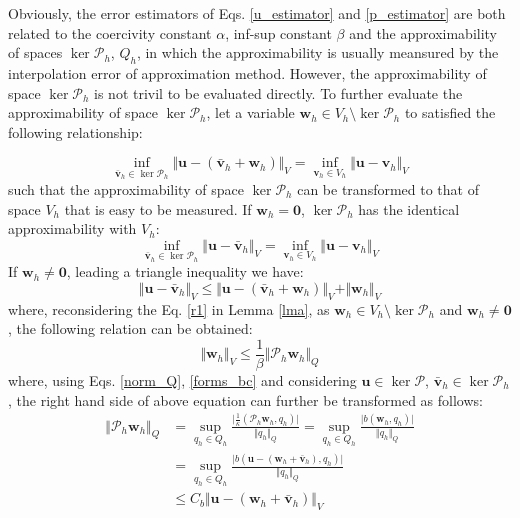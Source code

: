 Obviously,  
the error estimators of Eqs. \eqref{u_estimator} and \eqref{p_estimator} are both related to the coercivity constant $\alpha$, inf-sup constant $\beta$ and the approximability of spaces $\ker \mathcal P_h$, $Q_h$, in which the approximability is usually meansured by the interpolation error of approximation method.
However, the approximability of space $\ker \mathcal P_h$ is not trivil to be evaluated directly.
To further evaluate the approximability of space $\ker \mathcal P_h$, let a variable $\boldsymbol w_h \in V_h \setminus \ker \mathcal P_h$ to satisfied the following relationship:

\begin{equation}
\inf_{\bar{\boldsymbol v}_h \in \ker \mathcal P_h} \Vert \boldsymbol u - (\bar{\boldsymbol v}_h+\boldsymbol w_h) \Vert_V = \inf_{\boldsymbol v_h \in V_h} \Vert \boldsymbol u - \boldsymbol v_h \Vert_V
\end{equation}
such that the approximability of space $\ker \mathcal P_h$ can be transformed to that of space $V_h$ that is easy to be measured.
If $\boldsymbol w_h = \boldsymbol 0$, $\ker \mathcal P_h$ has the identical approximability with $V_h$:
\begin{equation}
\inf_{\bar{\boldsymbol v}_h \in \ker \mathcal P_h} \Vert \boldsymbol u - \bar{\boldsymbol v}_h \Vert_V = \inf_{\boldsymbol v_h \in V_h} \Vert \boldsymbol u - \boldsymbol v_h \Vert_V
\end{equation}
If $\boldsymbol w_h \neq \boldsymbol 0$, leading a triangle inequality we have:
\begin{equation}\label{kerp_estimator_1}
\Vert \boldsymbol u - \bar{\boldsymbol v}_h \Vert_V \le \Vert \boldsymbol u - (\bar{\boldsymbol v}_h+\boldsymbol w_h) \Vert_V + \Vert \boldsymbol w_h \Vert_V
\end{equation}
where, reconsidering the Eq. \eqref{r1} in Lemma \ref{lma}, as $\boldsymbol w_h \in V_h \setminus \ker \mathcal P_h$ and $\boldsymbol w_h \neq \boldsymbol 0$, the following relation can be obtained:
\begin{equation}\label{kerp_estimator_2}
\Vert \boldsymbol w_h \Vert_V \le \frac{1}{\beta} \Vert \mathcal P_h \boldsymbol w_h \Vert_Q
\end{equation}
where, using Eqs. \eqref{norm_Q}, \eqref{forms_bc} and considering $\boldsymbol u \in \ker \mathcal P$, $\bar{\boldsymbol v}_h \in \ker \mathcal P_h$, the right hand side of above equation can further be transformed as follows:
\begin{equation}\label{kerp_estimator_3}
\begin{split}
\Vert \mathcal P_h \boldsymbol w_h \Vert_Q &= \sup_{q_h \in Q_h} \frac{\vert \frac{1}{\kappa}(\mathcal P_h \boldsymbol w_h, q_h)\vert}{\Vert q_h\Vert_Q} 
= \sup_{q_h \in Q_h} \frac{\vert b(\boldsymbol w_h, q_h)\vert}{\Vert q_h\Vert_Q} \\
&= \sup_{q_h \in Q_h} \frac{\vert b(\boldsymbol u-(\boldsymbol w_h+\bar{\boldsymbol v}_h), q_h)\vert}{\Vert q_h\Vert_Q} \\
&\le C_b \Vert \boldsymbol u - (\boldsymbol w_h + \bar{\boldsymbol v}_h) \Vert_V
\end{split}
\end{equation}
